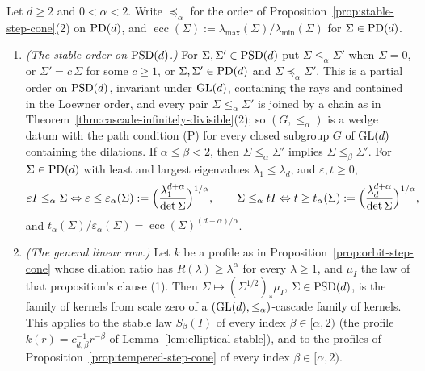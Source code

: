 \begin{proposition}\label{prop:similarity-stable-order-families}
Let $d \ge 2$ and $0 < \alpha < 2$. Write $\preceq_\alpha$ for the order of
Proposition~\ref{prop:stable-step-cone}(2) on $\mathrm{PD}(d)$, and $\operatorname{ecc}(\Sigma) :=
\lambda_{\max}(\Sigma)/\lambda_{\min}(\Sigma)$ for $\Sigma \in \mathrm{PD}(d)$.
\begin{enumerate}
\item \emph{(The stable order on $\mathrm{PSD}(d)$.)} For $\Sigma, \Sigma' \in \mathrm{PSD}(d)$ put
$\Sigma \le_\alpha \Sigma'$ when $\Sigma = 0$, or $\Sigma' = c\,\Sigma$ for some $c \ge 1$, or
$\Sigma, \Sigma' \in \mathrm{PD}(d)$ and $\Sigma \preceq_\alpha \Sigma'$. This is a partial order on $\mathrm{PSD}(d)$,
invariant under $\mathrm{GL}(d)$, containing the rays and contained in the Loewner order, and every pair
$\Sigma \le_\alpha \Sigma'$ is joined by a chain as in Theorem~\ref{thm:cascade-infinitely-divisible}(2); so
$(G, \le_\alpha)$ is a wedge datum with the path condition (P) for every closed subgroup $G$ of $\mathrm{GL}(d)$
containing the dilations. If $\alpha \le \beta < 2$, then $\Sigma \le_\alpha \Sigma'$ implies
$\Sigma \le_\beta \Sigma'$. For $\Sigma \in \mathrm{PD}(d)$ with least and largest eigenvalues
$\lambda_1 \le \lambda_d$, and $\varepsilon, t \ge 0$,
\[
  \varepsilon I \le_\alpha \Sigma \Leftrightarrow \varepsilon \le \varepsilon_\alpha(\Sigma) :=
  \Bigl(\frac{\lambda_1^{d+\alpha}}{\det\Sigma}\Bigr)^{1/\alpha} ,
  \qquad
  \Sigma \le_\alpha tI \Leftrightarrow t \ge t_\alpha(\Sigma) :=
  \Bigl(\frac{\lambda_d^{d+\alpha}}{\det\Sigma}\Bigr)^{1/\alpha} ,
\]
and $t_\alpha(\Sigma)/\varepsilon_\alpha(\Sigma) = \operatorname{ecc}(\Sigma)^{(d+\alpha)/\alpha}$.
\item \emph{(The general linear row.)} Let $k$ be a profile as in Proposition~\ref{prop:orbit-step-cone} whose
dilation ratio has $R(\lambda) \ge \lambda^\alpha$ for every $\lambda \ge 1$, and $\mu_I$ the law of that
proposition's clause (1). Then $\Sigma \mapsto (\Sigma^{1/2})_*\mu_I$, $\Sigma \in \mathrm{PSD}(d)$, is the family of
kernels from scale zero of a $(\mathrm{GL}(d), \le_\alpha)$-cascade family of kernels. This applies to the stable
law $S_\beta(I)$ of every index $\beta \in [\alpha, 2)$ (the profile $k(r) = c_{d,\beta}^{-1}r^{-\beta}$ of
Lemma~\ref{lem:elliptical-stable}), and to the profiles of Proposition~\ref{prop:tempered-step-cone} of every index
$\beta \in [\alpha, 2)$.
\end{enumerate}
\end{proposition}

